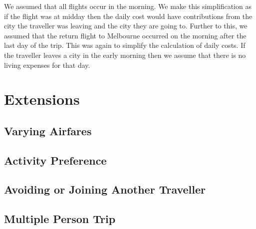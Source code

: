 \documentclass[12pt]{article}
\begin{document}
We assumed that all flights occur in the morning. We make this simplification as if the flight was at midday then the daily cost would have contributions from the city the traveller was leaving and the city they are going to. Further to this, we assumed that the return flight to Melbourne occurred on the morning after the last day of the trip. This was again to simplify the calculation of daily costs. If the traveller leaves a city in the early morning then we assume that there is no living expenses for that day.



\pagebreak

\section{Extensions} 
\label{sec:extensions}


\lipsum[3]

\subsection{Varying Airfares}


\subsection{Activity Preference}


\subsection{Avoiding or Joining Another Traveller}


\subsection{Multiple Person Trip}




\pagebreak
\end{document}
